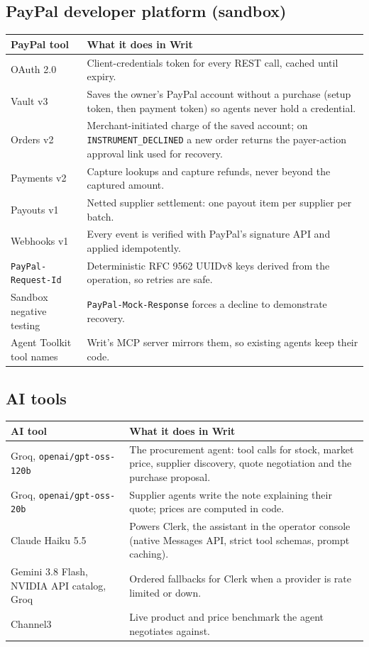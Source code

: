 \documentclass[11pt]{article}
\begin{document}
\subsection*{PayPal developer platform (sandbox)}
\begin{tabularx}{\linewidth}{@{}lL@{}}
\toprule
PayPal tool & What it does in Writ\\
\midrule
OAuth 2.0 & Client-credentials token for every REST call, cached until expiry.\\
Vault v3 & Saves the owner's PayPal account without a purchase (setup token, then payment token) so agents never hold a credential.\\
Orders v2 & Merchant-initiated charge of the saved account; on \texttt{INSTRUMENT\_DECLINED} a new order returns the payer-action approval link used for recovery.\\
Payments v2 & Capture lookups and capture refunds, never beyond the captured amount.\\
Payouts v1 & Netted supplier settlement: one payout item per supplier per batch.\\
Webhooks v1 & Every event is verified with PayPal's signature API and applied idempotently.\\
\texttt{PayPal-Request-Id} & Deterministic RFC 9562 UUIDv8 keys derived from the operation, so retries are safe.\\
Sandbox negative testing & \texttt{PayPal-Mock-Response} forces a decline to demonstrate recovery.\\
Agent Toolkit tool names & Writ's MCP server mirrors them, so existing agents keep their code.\\
\bottomrule
\end{tabularx}

\subsection*{AI tools}
\begin{tabularx}{\linewidth}{@{}lL@{}}
\toprule
AI tool & What it does in Writ\\
\midrule
Groq, \texttt{openai/gpt-oss-120b} & The procurement agent: tool calls for stock, market price, supplier discovery, quote negotiation and the purchase proposal.\\
Groq, \texttt{openai/gpt-oss-20b} & Supplier agents write the note explaining their quote; prices are computed in code.\\
Claude Haiku 5.5 & Powers Clerk, the assistant in the operator console (native Messages API, strict tool schemas, prompt caching).\\
Gemini 3.8 Flash, NVIDIA API catalog, Groq & Ordered fallbacks for Clerk when a provider is rate limited or down.\\
Channel3 & Live product and price benchmark the agent negotiates against.\\
\bottomrule
\end{tabularx}
\end{document}
